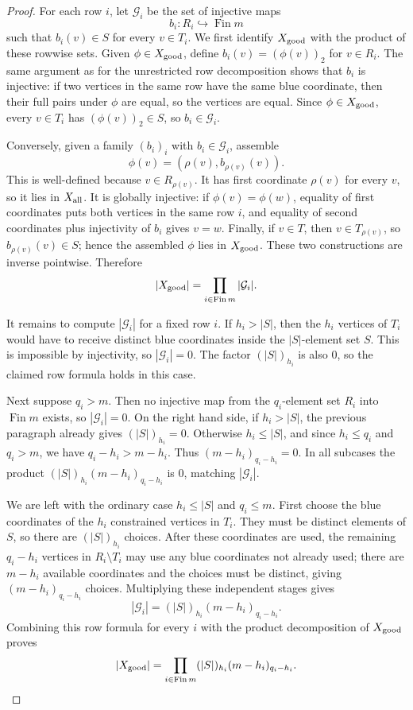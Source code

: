 \begin{proof}
For each row \(i\), let \(\mathcal G_i\) be the set of injective maps
\[
b_i:R_i\hookrightarrow \operatorname{Fin}m
\]
such that \(b_i(v)\in S\) for every \(v\in T_i\).  We first identify
\(X_{\rm good}\) with the product of these rowwise sets.  Given
\(\phi\in X_{\rm good}\), define \(b_i(v)=(\phi(v))_2\) for \(v\in R_i\).
The same argument as for the unrestricted row decomposition shows that
\(b_i\) is injective: if two vertices in the same row have the same blue
coordinate, then their full pairs under \(\phi\) are equal, so the vertices
are equal.  Since \(\phi\in X_{\rm good}\), every \(v\in T_i\) has
\((\phi(v))_2\in S\), so \(b_i\in\mathcal G_i\).

Conversely, given a family \((b_i)_i\) with \(b_i\in\mathcal G_i\), assemble
\[
\phi(v)=(\rho(v),b_{\rho(v)}(v)).
\]
This is well-defined because \(v\in R_{\rho(v)}\).  It has first coordinate
\(\rho(v)\) for every \(v\), so it lies in \(X_{\rm all}\).  It is globally
injective: if \(\phi(v)=\phi(w)\), equality of first coordinates puts both
vertices in the same row \(i\), and equality of second coordinates plus
injectivity of \(b_i\) gives \(v=w\).  Finally, if \(v\in T\), then
\(v\in T_{\rho(v)}\), so \(b_{\rho(v)}(v)\in S\); hence the assembled
\(\phi\) lies in \(X_{\rm good}\).  These two constructions are inverse
pointwise.  Therefore
\[
|X_{\rm good}|=\prod_{i\in\operatorname{Fin}m}|\mathcal G_i|.
\]

It remains to compute \(|\mathcal G_i|\) for a fixed row \(i\).  If
\(h_i>|S|\), then the \(h_i\) vertices of \(T_i\) would have to receive
distinct blue coordinates inside the \(|S|\)-element set \(S\).  This is
impossible by injectivity, so \(|\mathcal G_i|=0\).  The factor
\((|S|)_{h_i}\) is also \(0\), so the claimed row formula holds in this
case.

Next suppose \(q_i>m\).  Then no injective map from the \(q_i\)-element set
\(R_i\) into \(\operatorname{Fin}m\) exists, so \(|\mathcal G_i|=0\).  On the
right hand side, if \(h_i>|S|\), the previous paragraph already gives
\((|S|)_{h_i}=0\).  Otherwise \(h_i\le |S|\), and since \(h_i\le q_i\) and
\(q_i>m\), we have \(q_i-h_i>m-h_i\).  Thus
\((m-h_i)_{q_i-h_i}=0\).  In all subcases the product
\((|S|)_{h_i}(m-h_i)_{q_i-h_i}\) is \(0\), matching
\(|\mathcal G_i|\).

We are left with the ordinary case \(h_i\le |S|\) and \(q_i\le m\).  First
choose the blue coordinates of the \(h_i\) constrained vertices in \(T_i\).
They must be distinct elements of \(S\), so there are \((|S|)_{h_i}\)
choices.  After these coordinates are used, the remaining \(q_i-h_i\)
vertices in \(R_i\setminus T_i\) may use any blue coordinates not already
used; there are \(m-h_i\) available coordinates and the choices must be
distinct, giving \((m-h_i)_{q_i-h_i}\) choices.  Multiplying these independent
stages gives
\[
|\mathcal G_i|=(|S|)_{h_i}(m-h_i)_{q_i-h_i}.
\]
Combining this row formula for every \(i\) with the product decomposition of
\(X_{\rm good}\) proves
\[
|X_{\rm good}|
=\prod_{i\in\operatorname{Fin}m} (|S|)_{h_i}(m-h_i)_{q_i-h_i}.
\]
\end{proof}
